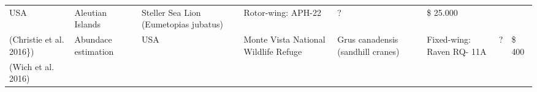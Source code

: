 \documentclass[]{interact}
\theoremstyle{plain}%
\theoremstyle{definition}
\theoremstyle{remark}
\begin{document}
\begin{longtable}[]{@{}llllllll@{}}
\begin{minipage}[t]{0.03\columnwidth}
USA\strut
\end{minipage} & \begin{minipage}[t]{0.14\columnwidth}\raggedright\strut
Aleutian Islands\strut
\end{minipage} & \begin{minipage}[t]{0.10\columnwidth}\raggedright\strut
Steller Sea Lion (Eumetopias jubatus)\strut
\end{minipage} & \begin{minipage}[t]{0.09\columnwidth}\raggedright\strut
Rotor-wing: APH-22\strut
\end{minipage} & \begin{minipage}[t]{0.11\columnwidth}\raggedright\strut
?\strut
\end{minipage} & \begin{minipage}[t]{0.01\columnwidth}\raggedright\strut
\$ 25.000\strut
\end{minipage}\tabularnewline
\begin{minipage}[t]{0.11\columnwidth}\raggedright\strut
(Christie et al. 2016\})\strut
\end{minipage} & \begin{minipage}[t]{0.18\columnwidth}\raggedright\strut
Abundace estimation\strut
\end{minipage} & \begin{minipage}[t]{0.03\columnwidth}\raggedright\strut
USA\strut
\end{minipage} & \begin{minipage}[t]{0.14\columnwidth}\raggedright\strut
Monte Vista National Wildlife Refuge\strut
\end{minipage} & \begin{minipage}[t]{0.10\columnwidth}\raggedright\strut
Grus canadensis (sandhill cranes)\strut
\end{minipage} & \begin{minipage}[t]{0.09\columnwidth}\raggedright\strut
Fixed-wing: Raven RQ- 11A\strut
\end{minipage} & \begin{minipage}[t]{0.11\columnwidth}\raggedright\strut
?\strut
\end{minipage} & \begin{minipage}[t]{0.01\columnwidth}\raggedright\strut
\$ 400\strut
\end{minipage}\tabularnewline
\begin{minipage}[t]{0.11\columnwidth}\raggedright\strut
(Wich et al. 2016)\strut
\end{minipage} & \begin{minipage}[t]{0.18\columnwidth}\raggedright\strut

\end{minipage}
\end{longtable}
\end{document}
